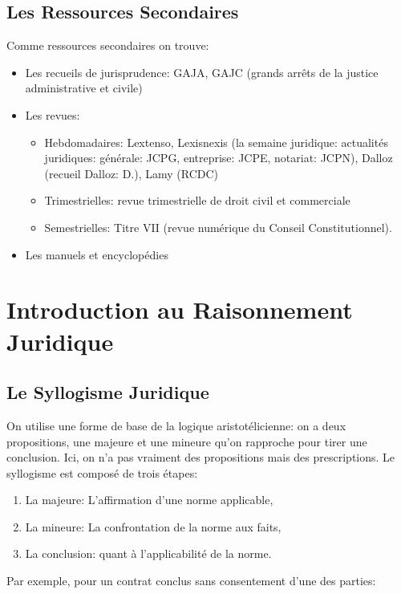 \documentclass[math]{cours}
\begin{document}
\subsection*{Les Ressources Secondaires}
Comme ressources secondaires on trouve:
\begin{itemize}
	\item Les recueils de jurisprudence: GAJA, GAJC (grands arrêts de la justice administrative et civile)
	\item Les revues:
	      \begin{itemize}
		      \item Hebdomadaires: Lextenso, Lexisnexis (la semaine juridique: actualités juridiques: générale: JCPG, entreprise: JCPE, notariat: JCPN), Dalloz (recueil Dalloz: D.), Lamy (RCDC)
		      \item Trimestrielles: revue trimestrielle de droit civil et commerciale
		      \item Semestrielles: Titre VII (revue numérique du Conseil Constitutionnel).
	      \end{itemize}
	\item Les manuels et encyclopédies
\end{itemize}

\section{Introduction au Raisonnement Juridique}
\subsection{Le Syllogisme Juridique}
On utilise une forme de base de la logique aristotélicienne: on a deux propositions, une majeure et une mineure qu'on rapproche pour tirer une conclusion.
Ici, on n'a pas vraiment des propositions mais des prescriptions.
Le syllogisme est composé de trois étapes:
\begin{enumerate}
	\item La majeure: L'affirmation d'une norme applicable,
	\item La mineure: La confrontation de la norme aux faits,
	\item La conclusion: quant à l'applicabilité de la norme.
\end{enumerate}

Par exemple, pour un contrat conclus sans consentement d'une des parties:
\end{document}

